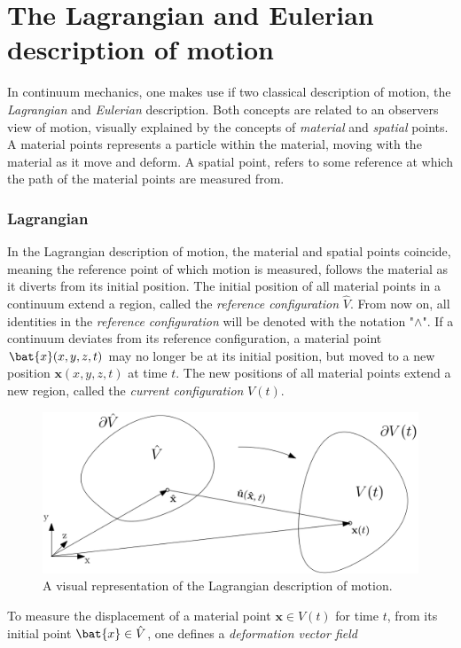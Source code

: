 \section{The Lagrangian and Eulerian description of motion}
In continuum mechanics, one makes use if two classical description of motion, the \textit{Lagrangian} and \textit{Eulerian} description. Both concepts are related to an observers view of motion, visually explained by the concepts of \textit{material} and \textit{spatial} points. A material points represents a particle within the material, moving with the material as it move and deform. A spatial point, refers to some reference at which the path of the material points are measured from. 
\subsubsection*{Lagrangian}
In the Lagrangian description of motion, the material and spatial points coincide, meaning the reference point of which motion is measured, follows the material as it diverts from its initial position. The initial position of all material points in a continuum extend a region, called the \textit{reference configuration} $\hat{V}$. From now on, all identities in the \textit{reference configuration} will be denoted with the notation "$\wedge$". If a continuum deviates from its reference configuration, a material point $\bat{x}(x, y, z ,t)$ may no longer be at its initial position, but moved to a new position $\mathbf{x}(x, y, z, t)$ at time $t$.  The new positions of all material points extend a new region, called the \textit{current configuration} $V(t)$. 
\begin{figure}[h!]
  \centering
    \includegraphics[scale=0.4]{./Fig/lagframe.png}
      \caption{A visual representation of the Lagrangian description of motion.}
\end{figure}
\newpage
To measure the displacement of a material point $\mathbf{x} \in V(t)$ for time $t$, from its initial point $\bat{x} \in \hat{V}$, one defines a \textit{deformation vector field} 
